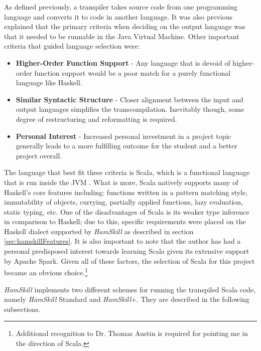 \documentclass{report}
\begin{document}
As defined previously, a transpiler takes source code from one programming language and converts it to code in another language.  It was also previous explained that the primary criteria when deciding on the output language was that it needed to be runnable in the Java Virtual Machine.  Other important criteria that guided language selection were:

\begin{itemize}

	\item \textbf{Higher-Order Function Support} - Any language that is devoid of higher-order function support would be a poor match for a purely functional language like Haskell.
	
	\item \textbf{Similar Syntactic Structure} - Closer alignment between the input and output languages simplifies the transcompilation.  Inevitably though, some degree of restructuring and reformatting is required.  
	
	\item \textbf{Personal Interest} - Increased personal investment in a project topic generally leads to a more fulfilling outcome for the student and a better project overall.  

\end{itemize}

The language that best fit these criteria is Scala, which is a functional language that is run inside the JVM \cite{whatIsScala}. What is more, Scala natively supports many of Haskell's core features including: functions written in a pattern matching style, immutability of objects, currying, partially applied functions, lazy evaluation, static typing, etc.  One of the disadvantages of Scala is its weaker type inference in comparison to Haskell; due to this, specific requirements were placed on the Haskell dialect supported by \textit{HamSkill} as described in section \ref{sec:hamskillFeatures}.  It is also important to note that the author has had a personal predisposed interest towards learning Scala given its extensive support by Apache Spark.  Given all of these factors, the selection of Scala for this project became an obvious choice.\footnote{Additional recognition to Dr. Thomas Austin is required for pointing me in the direction of Scala.}

\textit{HamSkill} implements two different schemes for running the transpiled Scala code, namely \textit{HamSkill} Standard and \textit{HamSkill}+.  They are described in the following subsections.
\end{document}
